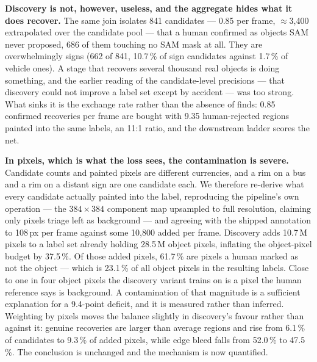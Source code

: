 \documentclass[conference]{IEEEtran}
\begin{document}
\textbf{Discovery is not, however, useless, and the aggregate hides what it does recover.}
The same join isolates 841 candidates --- 0.85 per frame, $\approx$3{,}400 extrapolated over the
candidate pool --- that a human confirmed as objects SAM never proposed, 686 of them touching no SAM
mask at all. They are overwhelmingly signs (662 of 841, 10.7\,\% of sign candidates against 1.7\,\% of
vehicle ones). A stage that recovers several thousand real objects is doing something, and the earlier
reading of the candidate-level precisions --- that discovery could not improve a label set except by
accident --- was too strong. What sinks it is the exchange rate rather than the absence of finds: 0.85
confirmed recoveries per frame are bought with 9.35 human-rejected regions painted into the same
labels, an 11:1 ratio, and the downstream ladder scores the net.

\textbf{In pixels, which is what the loss sees, the contamination is severe.}
Candidate counts and painted pixels are different currencies, and a rim on a bus and a rim on a distant
sign are one candidate each. We therefore re-derive what every candidate actually painted into the
label, reproducing the pipeline's own operation --- the $384{\times}384$ component map upsampled to full
resolution, claiming only pixels triage left as background --- and agreeing with the shipped annotation
to 108\,px per frame against some 10{,}800 added per frame.
Discovery adds 10.7\,M pixels to a label set already holding 28.5\,M object pixels, inflating the
object-pixel budget by 37.5\,\%. Of those added pixels, 61.7\,\% are pixels a human marked as not the
object --- which is 23.1\,\% of all object pixels in the resulting labels. Close to one in four object
pixels the discovery variant trains on is a pixel the human reference says is background.
A contamination of that magnitude is a sufficient explanation for a 9.4-point deficit, and it is
measured rather than inferred.
Weighting by pixels moves the balance slightly in discovery's favour rather than against it: genuine
recoveries are larger than average regions and rise from 6.1\,\% of candidates to 9.3\,\% of added
pixels, while edge bleed falls from 52.0\,\% to 47.5\,\%. The conclusion is unchanged and the mechanism
is now quantified.
\end{document}
